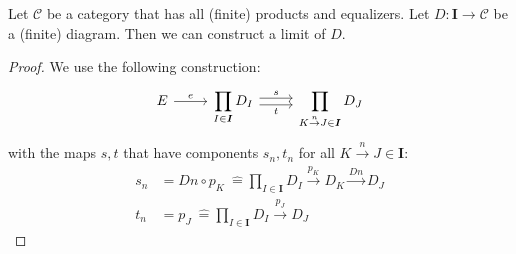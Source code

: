 \begin{theorem}
  \label{arbitrarylimits}
  Let $\mathscr C$ be a category that has all (finite) products and equalizers.
  Let $D : \bm I \to \mathscr C$ be a (finite) diagram.
  Then we can construct a limit of $D$.
\end{theorem}
\begin{proof}
We use the following construction:
\[
  \begin{tikzcd}
    E \arrow{r}{e} &
    \displaystyle \prod_{I \in \bm{I}} D_I
    \arrow[r,shift left, "s"] \arrow[r,shift right,swap,"t"] &
    \displaystyle \prod_{K \overset{n}{\to} J \in \bm{I}} D_J
  \end{tikzcd}
\]
with the maps $s, t$ that have components $s_n, t_n$ for all $K \overset{n}{\to} J \in \bm{I}$:
\begin{align*}
  s_n &= Dn \circ p_K\ \hat{=} \prod_{I \in \bm{I}} D_I
        \overset{p_K}{\rightarrow} D_K \overset{Dn}{\rightarrow} D_J \\
  t_n &= p_J\ \hat{=} \prod_{I \in \bm{I}} D_I
        \overset{p_J}{\rightarrow} D_J
\end{align*}


\end{proof}
